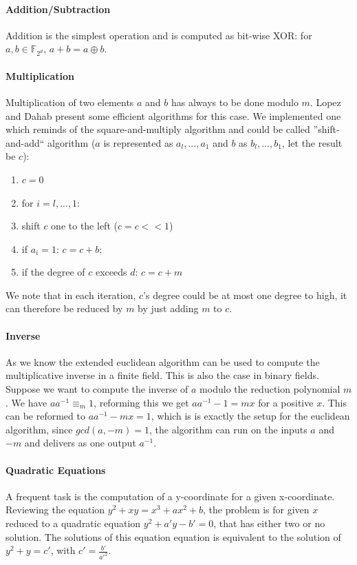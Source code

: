 \documentclass[11pt,english]{article}
\begin{document}
\paragraph{Addition/Subtraction}
Addition is the simplest operation and is computed as bit-wise XOR: for $a,b\in \mathbb{F}_{2^d}$, $a+b=a\oplus b$.
\paragraph{Multiplication}
Multiplication of two elements $a$ and $b$ has always to be done modulo $m$. Lopez and Dahab \cite{715867} present some efficient algorithms for this case. We implemented one which reminds of the square-and-multiply algorithm and could be called ''shift-and-add`` algorithm ($a$ is represented as $a_l,...,a_1$ and $b$ as $b_l,...,b_1$, let the result be $c$):
\begin{enumerate}
 \item $c=0$
 \item for $i=l,...,1$:
 \item shift $c$ one to the left ($c=c<<1$)
 \item if $a_i=1$: $c=c+b$;
 \item if the degree of $c$ exceeds $d$: $c=c+m$
\end{enumerate}
We note that in each iteration, $c$'s degree could be at most one degree to high, it can therefore be reduced by $m$ by just adding $m$ to $c$.

\paragraph{Inverse}
As we know the extended euclidean algorithm can be used to compute the multiplicative inverse in a finite field. This is also the case in binary fields. Suppose we want to compute the inverse of $a$ modulo the reduction polynomial $m$. We have $aa^{-1}\equiv_m 1$, reforming this we get $aa^{-1}-1=mx$ for a positive $x$. This can be reformed to $aa^{-1}-mx=1$, which is is exactly the setup for the euclidean algorithm, since $gcd(a,-m)=1$, the algorithm can run on the inputs $a$ and $-m$ and delivers as one output $a^{-1}$.

\paragraph{Quadratic Equations}
\label{binquadeq}
A frequent task is the computation of a y-coordinate for a given x-coordinate. Reviewing the equation $y^2+xy=x^3+ax^2+b$, the problem is for given $x$ reduced to a quadratic equation $y^2+a'y-b'=0$, that has either two or no solution. The solutions of this equation equation is equivalent to the solution of $y^2+y=c'$, with $c'=\frac{b'}{a'^2}$.
\end{document}
